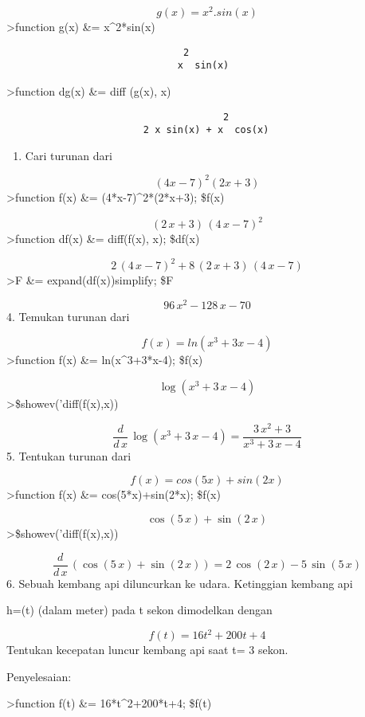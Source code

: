 \documentclass[
]{book}
\providecommand{\tightlist}{%
  \setlength{\itemsep}{0pt}\setlength{\parskip}{0pt}}
\begin{document}
\[g(x)=x^2.sin(x)\]\textgreater function g(x) \&= x\^{}2*sin(x)

\begin{verbatim}
                               2
                              x  sin(x)
\end{verbatim}

\textgreater function dg(x) \&= diff (g(x), x)

\begin{verbatim}
                                      2
                        2 x sin(x) + x  cos(x)
\end{verbatim}

\begin{enumerate}
\def\labelenumi{\arabic{enumi}.}
\setcounter{enumi}{2}
\tightlist
\item
  Cari turunan dari
\end{enumerate}

\[(4x-7)^2(2x+3)\]\textgreater function f(x) \&= (4*x-7)\^{}2*(2*x+3); \$f(x)

\[\left(2\,x+3\right)\,\left(4\,x-7\right)^2\]\textgreater function df(x) \&= diff(f(x), x); \$df(x)

\[2\,\left(4\,x-7\right)^2+8\,\left(2\,x+3\right)\,\left(4\,x-7  \right)\]\textgreater F \&= expand(df(x))\textbar simplify; \$F

\[96\,x^2-128\,x-70\]4. Temukan turunan dari

\[f(x)=ln(x^3+3x-4)\]\textgreater function f(x) \&= ln(x\^{}3+3*x-4); \$f(x)

\[\log \left(x^3+3\,x-4\right)\]\textgreater\$showev('diff(f(x),x))

\[\frac{d}{d\,x}\,\log \left(x^3+3\,x-4\right)=\frac{3\,x^2+3}{x^3+3  \,x-4}\]5. Tentukan turunan dari

\[f(x)=cos(5x)+sin(2x)\]\textgreater function f(x) \&= cos(5*x)+sin(2*x); \$f(x)

\[\cos \left(5\,x\right)+\sin \left(2\,x\right)\]\textgreater\$showev('diff(f(x),x))

\[\frac{d}{d\,x}\,\left(\cos \left(5\,x\right)+\sin \left(2\,x\right)  \right)=2\,\cos \left(2\,x\right)-5\,\sin \left(5\,x\right)\]6. Sebuah kembang api diluncurkan ke udara. Ketinggian kembang api

h=(t) (dalam meter) pada t sekon dimodelkan dengan

\[f(t)=16t^2+200t+4\] Tentukan kecepatan luncur kembang api saat t= 3 sekon.

Penyelesaian:

\textgreater function f(t) \&= 16*t\^{}2+200*t+4; \$f(t)
\end{document}

